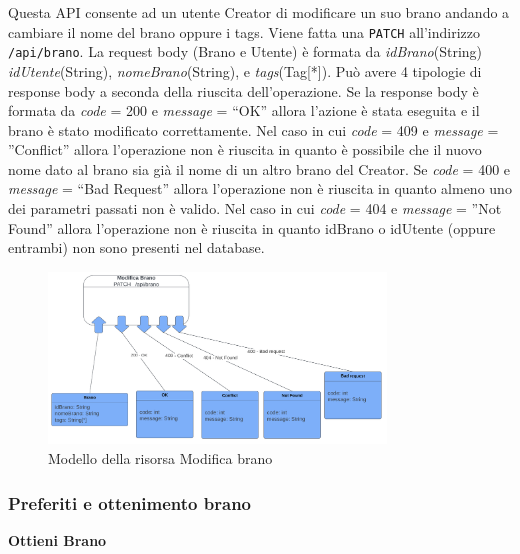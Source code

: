 \documentclass[a4paper,12pt]{article}
\begin{document}
Questa API consente ad un utente Creator di modificare un suo brano andando a cambiare il nome del brano oppure i tags. Viene fatta una \texttt{PATCH} all’indirizzo \texttt{/api/brano}. \newline
La request body (Brano e Utente) è formata da \textit{idBrano}(String) \textit{idUtente}(String), \textit{nomeBrano}(String), e \textit{tags}(Tag[*]). \newline
Può avere 4 tipologie di response body a seconda della riuscita dell’operazione. \newline
Se la response body è formata da \textit{code} = 200 e \textit{message} = “OK” allora l'azione è stata eseguita e il brano è stato modificato correttamente. \newline
Nel caso in cui \textit{code} = 409  e \textit{message} = ”Conflict” allora l’operazione non è riuscita in quanto è possibile che il nuovo nome dato al brano sia già il nome di un altro brano del Creator. \newline
Se \textit{code} = 400 e \textit{message} = “Bad Request” allora l’operazione non è riuscita in quanto almeno uno dei parametri passati non è valido. \newline
Nel caso in cui \textit{code} = 404  e \textit{message} = ”Not Found” allora l’operazione non è riuscita in quanto idBrano o idUtente (oppure entrambi) non sono presenti nel database.

\begin{figure}[htp]
    \centering
    \includegraphics[width=0.8\textwidth]{resource-models/modifica-brano.png}
    \caption{Modello della risorsa Modifica brano}
\end{figure}

\subsubsection*{Preferiti e ottenimento brano}

\textbf{Ottieni Brano}
\end{document}
